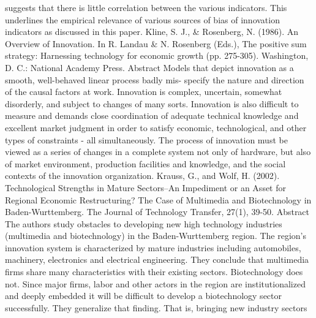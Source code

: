 \documentclass[a4paper,11pt]{article}
\begin{document}
suggests that there is little correlation between the various indicators. This underlines the empirical relevance of various sources of bias of innovation indicators as discussed in this paper.
Kline, S. J., & Rosenberg, N. (1986). An Overview of Innovation. In R. Landau & N. Rosenberg (Eds.), The positive sum strategy: Harnessing technology for economic growth (pp. 275-305). Washington, D. C.: National Academy Press.
Abstract
Models that depict innovation as a smooth, well-behaved linear process badly mis- specify the nature and direction of the causal factors at work. Innovation is complex, uncertain, somewhat disorderly, and subject to changes of many sorts.
Innovation is also difficult to measure and demands close coordination of adequate technical knowledge and excellent market judgment in order to satisfy economic, technological, and other types of constraints - all simultaneously. The process of innovation must be viewed as a series of changes in a complete system not only of hardware, but also of market environment, production facilities and knowledge, and the social contexts of the innovation organization.
Krauss, G., and Wolf, H. (2002). Technological Strengths in Mature Sectors--An Impediment or an Asset for Regional Economic Restructuring? The Case of Multimedia and Biotechnology in Baden-Wurttemberg. The Journal of Technology Transfer, 27(1), 39-50.
Abstract
The authors study obstacles to developing new high technology industries (multimedia and biotechnology) in the Baden-Wurttemberg region. The region’s innovation system is characterized by mature industries including automobiles, machinery, electronics and electrical engineering. They conclude that multimedia firms share many characteristics with their existing sectors. Biotechnology does not. Since major firms, labor and other actors in the region are institutionalized and deeply embedded it will be difficult to develop a biotechnology sector successfully. They generalize that finding.  That is, bringing new industry sectors
 
\end{document}
